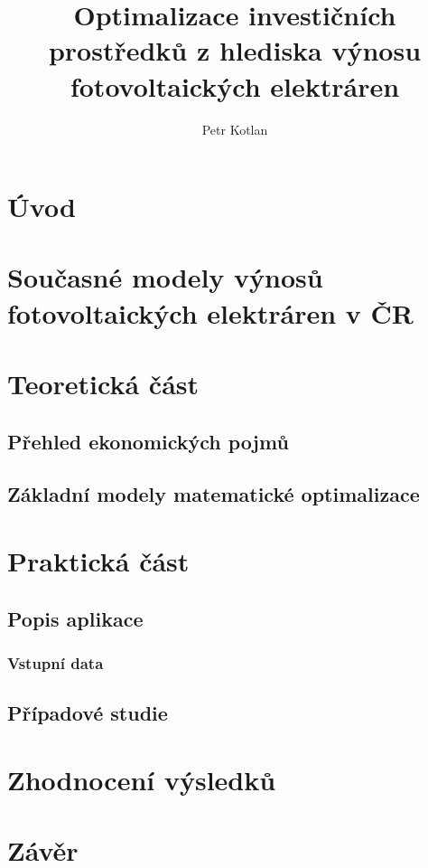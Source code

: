 \documentclass[a4paper, 12pt]{article}
\author{Petr Kotlan}
\title{Optimalizace investičních prostředků z hlediska
výnosu fotovoltaických elektráren}
\date{}
\begin{document}
\maketitle
\tableofcontents

\pagebreak

\section{Úvod}

\section{Současné modely výnosů fotovoltaických elektráren v ČR}

\section{Teoretická část}

\subsection{Přehled ekonomických pojmů}

\subsection{Základní modely matematické optimalizace}

\section{Praktická část}

\subsection{Popis aplikace}
\subsubsection{Vstupní data}


\subsection{Případové studie}

\section{Zhodnocení výsledků}

\section{Závěr}
\end{document}
